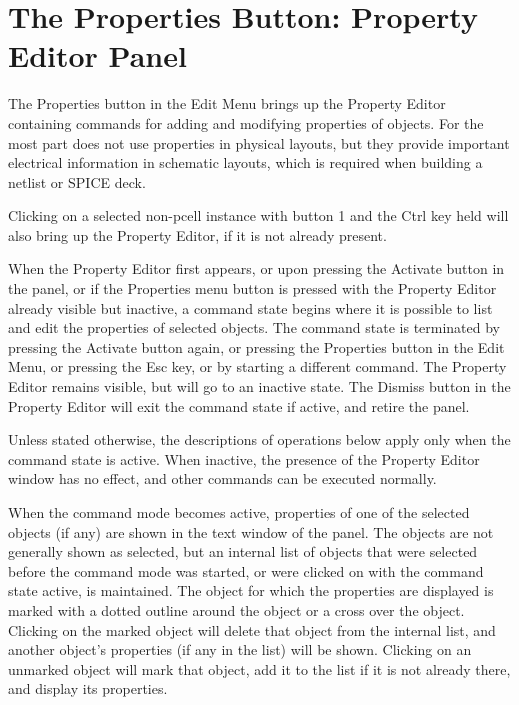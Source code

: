 \section{The {\cb Properties} Button: Property Editor Panel}
\label{prptybut}
The {\cb Properties} button in the {\cb Edit Menu} brings up the {\cb
Property Editor} containing commands for adding and modifying
properties of objects.  For the most part {\Xic} does not use
properties in physical layouts, but they provide important electrical
information in schematic layouts, which is required when building a
netlist or SPICE deck.

Clicking on a selected non-pcell instance with button 1 and the {\kb
Ctrl} key held will also bring up the {\cb Property Editor}, if it is
not already present.

When the {\cb Property Editor} first appears, or upon pressing the
{\cb Activate} button in the panel, or if the {\cb Properties} menu
button is pressed with the {\cb Property Editor} already visible but
inactive, a command state begins where it is possible to list and edit
the properties of selected objects.  The command state is terminated
by pressing the {\cb Activate} button again, or pressing the {\cb
Properties} button in the {\cb Edit Menu}, or pressing the {\kb Esc}
key, or by starting a different command.  The {\cb Property Editor}
remains visible, but will go to an inactive state.  The {\cb Dismiss}
button in the {\cb Property Editor} will exit the command state if
active, and retire the panel.

Unless stated otherwise, the descriptions of operations below apply
only when the command state is active.  When inactive, the presence of
the {\cb Property Editor} window has no effect, and other commands can
be executed normally.

When the command mode becomes active, properties of one of the
selected objects (if any) are shown in the text window of the panel. 
The objects are not generally shown as selected, but an internal list
of objects that were selected before the command mode was started, or
were clicked on with the command state active, is maintained.  The
object for which the properties are displayed is marked with a dotted
outline around the object or a cross over the object.  Clicking on the
marked object will delete that object from the internal list, and
another object's properties (if any in the list) will be shown. 
Clicking on an unmarked object will mark that object, add it to the
list if it is not already there, and display its properties.

